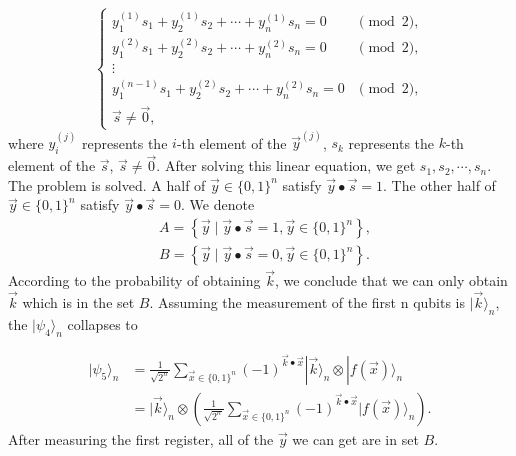 \begin{equation}
    \begin{cases}
y_1^{(1)} s_1+y_2^{(1)} s_2+\cdots+y_n^{(1)} s_n=0 & \pmod{2}, \\ 
y_1^{(2)} s_1+y_2^{(2)} s_2+\cdots+y_n^{(2)} s_n=0 & \pmod{2}, \\ 
\vdots \\ 
y_1^{(n-1)} s_1+y_2^{(2)} s_2+\cdots+y_n^{(2)} s_n=0 & \pmod{2}, \\
\vec{s} \neq \vec{0}, & 
\end{cases}
\end{equation}
where $y_i^{(j)}$ represents the $i$-th element of the $\vec{y}^{(j)}$, $s_k$ represents the $k$-th element of the $\vec{s}$, $\vec{s} \neq \vec{0}$. After solving this linear equation, we get $s_1, s_2, \cdots, s_n$. The problem is solved. A half of $\vec{y} \in \{0,1\}^n$ satisfy $\vec{y} \bullet \vec{s}=1$. The other half of $\vec{y} \in \{0,1\}^n$ satisfy $\vec{y} \bullet \vec{s}=0$. We denote 
\begin{equation}
\begin{aligned}
        & A=\left\{\vec{y} \mid \vec{y} \bullet \vec{s} = 1, \vec{y} \in\{0,1\}^n\right\}, \\
        & B=\left\{\vec{y} \mid \vec{y} \bullet \vec{s} = 0, \vec{y} \in\{0,1\}^n\right\}.
    \end{aligned}
\end{equation}
According to the probability of obtaining $\vec{k}$, we conclude that we can only obtain $\vec{k}$ which is in the set $B$. Assuming the measurement of the first n qubits is $|\vec{k}\rangle_n$, the $|\psi_4\rangle_n$ collapses to

\begin{equation}
\begin{aligned}
|\psi_5\rangle_n 
& = \frac{1}{\sqrt{2^n}} \sum_{\vec{x} \in\{0,1\}^n}(-1)^{\vec{k} \bullet \vec{x}}|\vec{k}\rangle_n \otimes|f(\vec{x})\rangle_n\\
& = |\vec{k}\rangle_n \otimes\left(\frac{1}{\sqrt{2^n}} \sum_{\vec{x} \in\{0,1\}^n}(-1)^{\vec{k} \bullet \vec{x}}|f(\vec{x})\rangle_n\right).
\end{aligned}
\end{equation}
After measuring the first register, all of the $\vec{y}$ we can get are in set $B$. 

